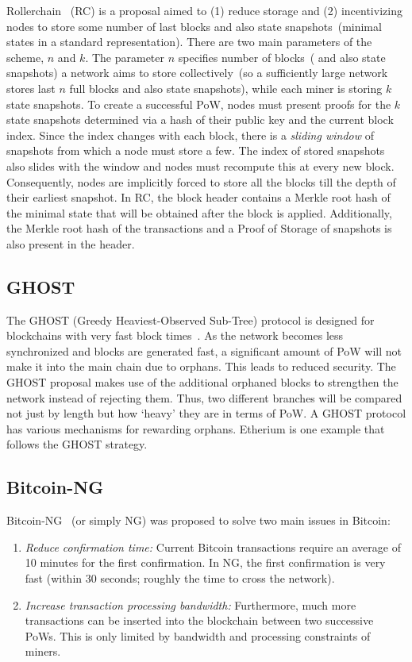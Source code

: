 \documentclass[]{report}   %
\begin{document}
Rollerchain~\cite{DBLP:journals/corr/ChepurnoyLO16} (RC) is a proposal aimed to (1) reduce storage and
(2) incentivizing nodes to store some number of last blocks and also state snapshots~(minimal states in a standard
representation). There are two main parameters of the scheme, $n$ and $k$. The parameter $n$ specifies number of blocks~(
and also state snapshots) a network aims to store collectively~(so a sufficiently large network stores last $n$ full
blocks and also state snapshots), while each miner is storing $k$ state snapshots. To create a successful PoW, nodes
must present proofs for the $k$ state snapshots determined via a hash of their public key and the current block index.
Since the index changes with each block, there is a {\em sliding window} of snapshots from which a node must store a few.
The index of stored snapshots also slides with the window and nodes must recompute this at every new block. Consequently,
nodes are implicitly forced to store all the blocks till the depth of their earliest snapshot.
In RC, the block header contains a Merkle root hash of the minimal state that will be obtained after the block is
applied. Additionally, the Merkle root hash of the transactions and a Proof of Storage of snapshots is also present
in the header.

\subsection{GHOST}

The GHOST (Greedy Heaviest-Observed Sub-Tree) protocol is designed for blockchains with very fast block times~\cite{cryptoeprint:2013:881}. As the network becomes less synchronized and blocks are generated fast, a significant amount of PoW will not make it into the main chain due to orphans. This leads to reduced security. The GHOST proposal makes use of the additional orphaned blocks to strengthen the network instead of rejecting them. Thus, two different branches will be compared not just by length but how `heavy' they are in terms of PoW. A GHOST protocol has various mechanisms for rewarding orphans. Etherium is one example that follows the GHOST strategy.

\subsection{Bitcoin-NG}

Bitcoin-NG~\cite{eyal2016bitcoin} (or simply NG) was proposed to solve two main issues in Bitcoin:
\begin{enumerate}
	\item {\em Reduce confirmation time:} Current Bitcoin transactions require an average of 10 minutes for the first confirmation. In NG, the first confirmation is very fast (within 30 seconds; roughly the time to cross the network). 
	\item {\em Increase transaction processing bandwidth:} Furthermore, much more transactions can be inserted into the blockchain between two successive PoWs. This is only limited by bandwidth and processing constraints of miners.
\end{enumerate}
\end{document}
